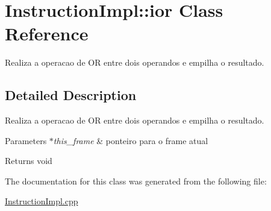 \hypertarget{class_instruction_impl_1_1ior}{}\section{Instruction\+Impl\+:\+:ior Class Reference}
\label{class_instruction_impl_1_1ior}


Realiza a operacao de OR entre dois operandos e empilha o resultado.  




\subsection{Detailed Description}
Realiza a operacao de OR entre dois operandos e empilha o resultado. 


\begin{DoxyParams}{Parameters}
{\em $\ast$this\+\_\+frame} & ponteiro para o frame atual \\
\hline
\end{DoxyParams}
\begin{DoxyReturn}{Returns}
void 
\end{DoxyReturn}


The documentation for this class was generated from the following file\+:\begin{DoxyCompactItemize}
\item 
\hyperlink{_instruction_impl_8cpp}{Instruction\+Impl.\+cpp}\end{DoxyCompactItemize}
